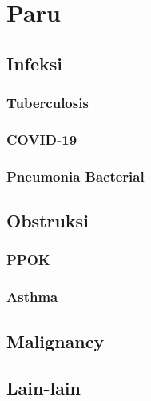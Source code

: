 \documentclass[
]{book}
\begin{document}
\hypertarget{paru}{%
\section{Paru}\label{paru}}

\hypertarget{infeksi-1}{%
\subsection{Infeksi}\label{infeksi-1}}

\hypertarget{tuberculosis}{%
\subsubsection{Tuberculosis}\label{tuberculosis}}

\hypertarget{covid-19}{%
\subsubsection{COVID-19}\label{covid-19}}

\hypertarget{pneumonia-bacterial}{%
\subsubsection{Pneumonia Bacterial}\label{pneumonia-bacterial}}

\hypertarget{obstruksi}{%
\subsection{Obstruksi}\label{obstruksi}}

\hypertarget{ppok}{%
\subsubsection{PPOK}\label{ppok}}

\hypertarget{asthma}{%
\subsubsection{Asthma}\label{asthma}}

\hypertarget{malignancy}{%
\subsection{Malignancy}\label{malignancy}}

\hypertarget{lain-lain}{%
\subsection{Lain-lain}\label{lain-lain}}
\end{document}
